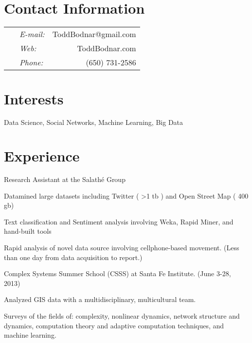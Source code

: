 \documentclass[margin,line]{res}
\newenvironment{list1}{
  \begin{list}{\ding{113}}{%
      \setlength{\itemsep}{0in}
      \setlength{\parsep}{0in} \setlength{\parskip}{0in}
      \setlength{\topsep}{0in} \setlength{\partopsep}{0in} 
      \setlength{\leftmargin}{0.17in}}}{\end{list}}
\begin{document}

\begin{resume}
\section{\sc Contact Information}
\vspace{.05in}
\begin{tabular}{@{}p{3.7in}p{.5in} r }
\   &  {\it E-mail:}  & ToddBodnar@gmail.com \\         
\   &  {\it Web:}  & ToddBodnar.com \\
\  & {\it Phone:} & (650) 731-2586 \\
\end{tabular}


\section{\sc Interests}
Data Science, Social Networks, Machine Learning, Big Data
\ \\



\section{\sc  Experience}
Research Assistant at the Salath\'e Group%
\begin{list1}
\item[] Datamined large datasets including Twitter  ( \textgreater 1 tb ) and Open Street Map ( 400 gb)
\item[] Text classification and Sentiment analysis involving Weka, Rapid Miner, and hand-built tools
\item[] Rapid analysis of novel data source involving cellphone-based movement. (Less than one day from data acquisition to report.)
\end{list1}
Complex Systems Summer School (CSSS) at Santa Fe Institute. (June 3-28, 2013)
\begin{list1}
\item[] Analyzed GIS data with a multidisciplinary, multicultural team.
\item[] Surveys of the fields of: complexity, nonlinear dynamics, network structure and dynamics, computation theory and adaptive computation techniques, and machine learning.
\end{list1}



\end{resume}
\end{document}
